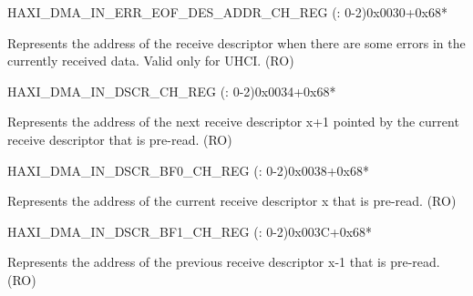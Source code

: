 \begin{register}{H}{AXI\_DMA\_IN\_ERR\_EOF\_DES\_ADDR\_CH\_REG (: 0-2)}{0x0030+0x68*}\label{regdesc:AXIDMAINERREOFDESADDRCHNREG}
%
\regnewline%
\begin{regdesc}\begin{reglist}
\label{fielddesc:AXIDMAINERREOFDESADDRCHN}\item [AXI\_DMA\_IN\_ERR\_EOF\_DES\_ADDR\_CH\regindex{n}] Represents the address of the receive descriptor when there are some errors in the currently received data. Valid only for UHCI. (RO)
\end{reglist}\end{regdesc}
\end{register}


\begin{register}{H}{AXI\_DMA\_IN\_DSCR\_CH\_REG (: 0-2)}{0x0034+0x68*}\label{regdesc:AXIDMAINDSCRCHNREG}
%
\regnewline%
\begin{regdesc}\begin{reglist}
\label{fielddesc:AXIDMAINLINKDSCRCHN}\item [AXI\_DMA\_INLINK\_DSCR\_CH\regindex{n}] Represents the address of the next receive descriptor x+1 pointed by the current receive descriptor that is pre-read. (RO)
\end{reglist}\end{regdesc}
\end{register}


\begin{register}{H}{AXI\_DMA\_IN\_DSCR\_BF0\_CH\_REG (: 0-2)}{0x0038+0x68*}\label{regdesc:AXIDMAINDSCRBF0CHNREG}
%
\regnewline%
\begin{regdesc}\begin{reglist}
\label{fielddesc:AXIDMAINLINKDSCRBF0CHN}\item [AXI\_DMA\_INLINK\_DSCR\_BF0\_CH\regindex{n}] Represents the address of the current receive descriptor x that is pre-read. (RO)
\end{reglist}\end{regdesc}
\end{register}


\begin{register}{H}{AXI\_DMA\_IN\_DSCR\_BF1\_CH\_REG (: 0-2)}{0x003C+0x68*}\label{regdesc:AXIDMAINDSCRBF1CHNREG}
%
\regnewline%
\begin{regdesc}\begin{reglist}
\label{fielddesc:AXIDMAINLINKDSCRBF1CHN}\item [AXI\_DMA\_INLINK\_DSCR\_BF1\_CH\regindex{n}] Represents the address of the previous receive descriptor x-1 that is pre-read. (RO)
\end{reglist}\end{regdesc}
\end{register}


